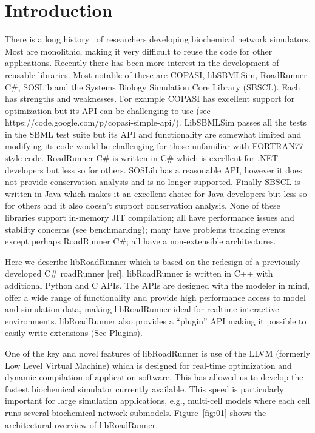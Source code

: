\documentclass{bioinfo}
\begin{document}
\section{Introduction}

There is a long history~\citep{Bag01} of researchers developing biochemical network simulators. Most are monolithic, making it very difficult to reuse the code for other applications. Recently there has been more interest in the development of reusable libraries. Most notable of these are COPASI, libSBMLSim, RoadRunner C\#, SOSLib and the Systems Biology Simulation Core Library (SBSCL). Each has strengths and weaknesses. For example COPASI has excellent support for optimization but its API can be challenging to use (see https://code.google.com/p/copasi-simple-api/). LibSBMLSim passes all the tests in the SBML test suite but its API and functionality are somewhat limited and modifying its code would be challenging for those unfamiliar with FORTRAN77-style code. RoadRunner C\# is written in C\# which is excellent for .NET developers but less so for others. SOSLib has a reasonable API, however it does not provide conservation analysis and is no longer supported. Finally SBSCL is written in Java which makes it an excellent choice for Java developers but less so for others and it also doesn't support conservation analysis. None of these libraries support in-memory JIT compilation; all have performance issues and stability concerns (see benchmarking); many have problems tracking events except perhaps RoadRunner C\#; all have a non-extensible architectures.

Here we describe libRoadRunner which is based on the redesign of a previously developed C\# roadRunner [ref]. libRoadRunner is written in C++ with additional Python and C APIs. The APIs are designed with the modeler in mind, offer a wide range of functionality and provide high performance access to model and simulation data, making libRoadRunner ideal for realtime interactive environments. libRoadRunner also provides a ``plugin'' API making it possible to easily write extensions (See Plugins). 

One of the key and novel features of libRoadRunner is use of the LLVM (formerly Low Level Virtual Machine) which is designed for real-time optimization and dynamic compilation of application software. This has allowed us to develop the fastest biochemical simulator currently available. This speed is particularly important for large simulation applications, e.g., multi-cell models where each cell runs several biochemical network submodels. Figure~\ref{fig:01} shows the architectural overview of libRoadRunner.
\end{document}
